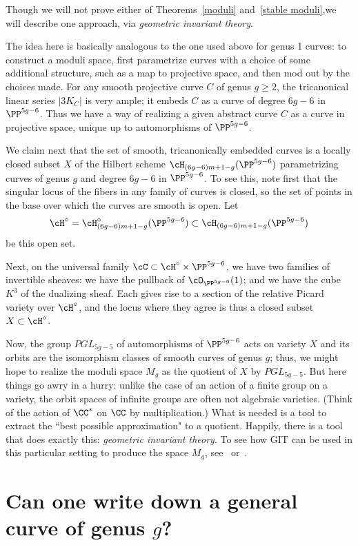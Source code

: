 Though we will not prove either of Theorems~\ref{moduli} and~\ref{stable moduli},we will describe one approach, via \emph{geometric invariant theory}.

The  idea here is basically analogous to the one used above for genus 1 curves: to construct a moduli space, first parametrize curves with a choice of some additional structure, such as a map to projective space, and then mod out by the choices made. For any smooth projective curve $C$ of genus $g\geq 2$, the tricanonical linear series $|3K_C|$ is very ample; it embeds $C$ as a curve of degree $6g-6$ in $\PP^{5g-6}$. Thus we have a way of realizing a given abstract curve $C$ as a curve in projective space, unique up to automorphisms of $\PP^{5g-6}$.

We claim next that the set of smooth, tricanonically embedded curves is a locally closed subset $X$ of the Hilbert scheme $\cH_{(6g-6)m+1-g}(\PP^{5g-6})$ parametrizing curves of genus $g$ and degree $6g-6$ in $\PP^{5g-6}$. To see this, note first that the singular locus of the fibers in any family of curves is closed, so the set of points in the base over which the curves are smooth is open.  Let 
$$
\cH^\circ = \cH^\circ_{(6g-6)m+1-g}(\PP^{5g-6})\subset \cH_{(6g-6)m+1-g}(\PP^{5g-6})
$$
be this open set.

Next, on the universal family $\cC \subset \cH^\circ \times \PP^{5g-6}$, we have two families of invertible sheaves: we have the pullback of $\cO_{\PP^{5g-6}}(1)$; and we have the cube $K^3$ of the dualizing sheaf. Each gives rise to a section of the relative Picard variety over $\cH^\circ$, and the locus where they agree is thus a closed subset $X \subset \cH^\circ$.

Now, the group $PGL_{5g-5}$ of automorphisms of $\PP^{5g-6}$ acts on variety $X$ and its orbits
are the isomorphism classes of smooth curves of genus $g$; thus, we might hope to realize the moduli space $M_g$ as the quotient of $X$ by $PGL_{5g-5}$. But here things go awry in a hurry: unlike the case of an action of a finite group on a variety,
the orbit spaces of infinite groups are often not algebraic varieties. (Think of the action of $\CC^*$ on $\CC$ by multiplication.) What is needed is a tool to extract the ``best possible approximation" to a quotient. Happily, there is a tool that does exactly this:  \emph{geometric invariant theory}.  To see how GIT can be used in this particular setting to produce the space $M_g$, see~\cite{Mumford-Morrison} or~\cite{Harris-Morrison}.

\section{Can one write down a general curve of genus $g$?}\label{mgunirational}

